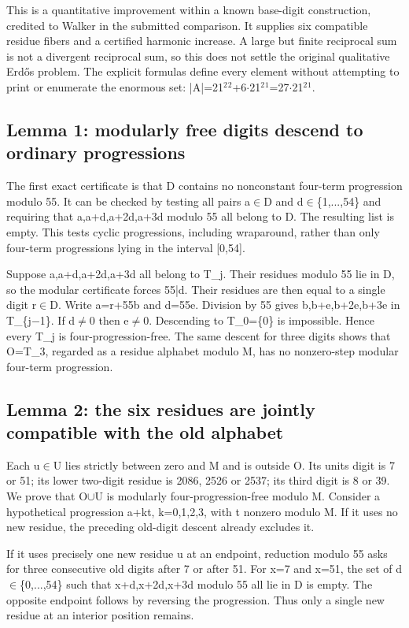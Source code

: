 \documentclass[11pt,a4paper]{article}
\begin{document}
This is a quantitative improvement within a known base-digit construction, credited to Walker in the submitted comparison. It supplies six compatible residue fibers and a certified harmonic increase. A large but finite reciprocal sum is not a divergent reciprocal sum, so this does not settle the original qualitative Erdős problem. The explicit formulas define every element without attempting to print or enumerate the enormous set: |A|=21\ensuremath{^2}\ensuremath{^2}+6\ensuremath{\cdot}21\ensuremath{^2}\ensuremath{^1}=27\ensuremath{\cdot}21\ensuremath{^2}\ensuremath{^1}.

\subsection{Lemma 1: modularly free digits descend to ordinary progressions}
The first exact certificate is that D contains no nonconstant four-term progression modulo 55. It can be checked by testing all pairs a\ensuremath{\in}D and d\ensuremath{\in}\{1,...,54\} and requiring that a,a+d,a+2d,a+3d modulo 55 all belong to D. The resulting list is empty. This tests cyclic progressions, including wraparound, rather than only four-term progressions lying in the interval [0,54].

Suppose a,a+d,a+2d,a+3d all belong to T\_j. Their residues modulo 55 lie in D, so the modular certificate forces 55|d. Their residues are then equal to a single digit r\ensuremath{\in}D. Write a=r+55b and d=55e. Division by 55 gives b,b+e,b+2e,b+3e in T\_\{j\ensuremath{-}1\}. If d\ensuremath{\neq}0 then e\ensuremath{\neq}0. Descending to T\_0=\{0\} is impossible. Hence every T\_j is four-progression-free. The same descent for three digits shows that O=T\_3, regarded as a residue alphabet modulo M, has no nonzero-step modular four-term progression.

\subsection{Lemma 2: the six residues are jointly compatible with the old alphabet}
Each u\ensuremath{\in}U lies strictly between zero and M and is outside O. Its units digit is 7 or 51; its lower two-digit residue is 2086, 2526 or 2537; its third digit is 8 or 39. We prove that O\ensuremath{\cup}U is modularly four-progression-free modulo M. Consider a hypothetical progression a+kt, k=0,1,2,3, with t nonzero modulo M. If it uses no new residue, the preceding old-digit descent already excludes it.

If it uses precisely one new residue u at an endpoint, reduction modulo 55 asks for three consecutive old digits after 7 or after 51. For x=7 and x=51, the set of d\ensuremath{\in}\{0,...,54\} such that x+d,x+2d,x+3d modulo 55 all lie in D is empty. The opposite endpoint follows by reversing the progression. Thus only a single new residue at an interior position remains.
\end{document}
